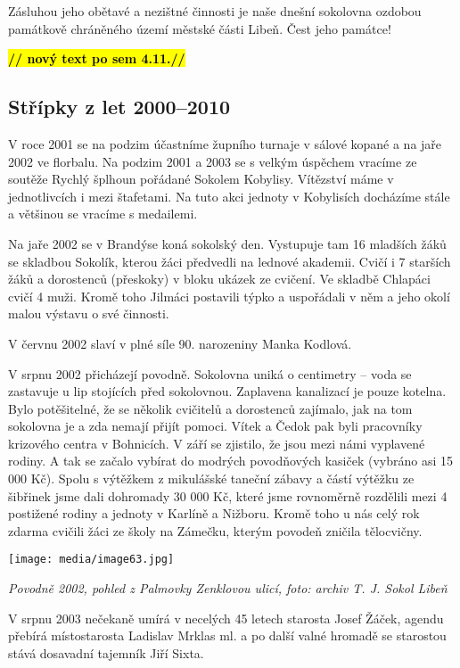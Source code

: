 Zásluhou jeho obětavé a nezištné činnosti je naše dnešní sokolovna
ozdobou památkově chráněného území městské části Libeň. Čest jeho
památce!

\textbf{\hl{// nový text po sem 4.11.//}}

\subsection{Střípky z let
2000--2010}\label{stux159uxedpky-z-let-20002010}

V roce 2001 se na podzim účastníme župního turnaje v sálové kopané a na
jaře 2002 ve florbalu. Na podzim 2001 a 2003 se s velkým úspěchem
vracíme ze soutěže Rychlý šplhoun pořádané Sokolem Kobylisy. Vítězství
máme v jednotlivcích i mezi štafetami. Na tuto akci jednoty v Kobylisích
docházíme stále a většinou se vracíme s medailemi.

Na jaře 2002 se v Brandýse koná sokolský den. Vystupuje tam 16 mladších
žáků se skladbou Sokolík, kterou žáci předvedli na lednové akademii.
Cvičí i 7 starších žáků a dorostenců (přeskoky) v bloku ukázek ze
cvičení. Ve skladbě Chlapáci cvičí 4 muži. Kromě toho Jilmáci postavili
týpko a uspořádali v něm a jeho okolí malou výstavu o své činnosti.

V červnu 2002 slaví v plné síle 90. narozeniny Manka Kodlová.

V srpnu 2002 přicházejí povodně. Sokolovna uniká o centimetry -- voda se
zastavuje u lip stojících před sokolovnou. Zaplavena kanalizací je pouze
kotelna. Bylo potěšitelné, že se několik cvičitelů a dorostenců
zajímalo, jak na tom sokolovna je a zda nemají přijít pomoci. Vítek a
Čedok pak byli pracovníky krizového centra v Bohnicích. V září se
zjistilo, že jsou mezi námi vyplavené rodiny. A tak se začalo vybírat do
modrých povodňových kasiček (vybráno asi 15 000 Kč). Spolu s výtěžkem z
mikulášské taneční zábavy a částí výtěžku ze šibřinek jsme dali
dohromady 30 000 Kč, které jsme rovnoměrně rozdělili mezi 4 postižené
rodiny a jednoty v Karlíně a Nižboru. Kromě toho u nás celý rok zdarma
cvičili žáci ze školy na Zámečku, kterým povodeň zničila tělocvičny.

\texttt{[image: media/image63.jpg]}

\emph{Povodně 2002, pohled z Palmovky Zenklovou ulicí, foto: archiv T.
J. Sokol Libeň}

V srpnu 2003 nečekaně umírá v necelých 45 letech starosta Josef Žáček,
agendu přebírá místostarosta Ladislav Mrklas ml. a po další valné
hromadě se starostou stává dosavadní tajemník Jiří Sixta.

